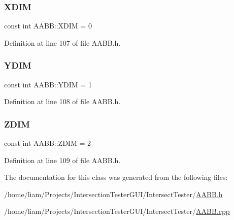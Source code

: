 \subsubsection{\texorpdfstring{X\+D\+IM}{XDIM}}
{\footnotesize\ttfamily const int A\+A\+B\+B\+::\+X\+D\+IM = 0\hspace{0.3cm}{\ttfamily [static]}}



Definition at line 107 of file A\+A\+B\+B.\+h.

\mbox{\label{class_a_a_b_b_a5192e3bdf0789cdc9e5f643b401e5b10}} 
\subsubsection{\texorpdfstring{Y\+D\+IM}{YDIM}}
{\footnotesize\ttfamily const int A\+A\+B\+B\+::\+Y\+D\+IM = 1\hspace{0.3cm}{\ttfamily [static]}}



Definition at line 108 of file A\+A\+B\+B.\+h.

\mbox{\label{class_a_a_b_b_a3e78cd8baa6ab6199afb2cb014e0db62}} 
\subsubsection{\texorpdfstring{Z\+D\+IM}{ZDIM}}
{\footnotesize\ttfamily const int A\+A\+B\+B\+::\+Z\+D\+IM = 2\hspace{0.3cm}{\ttfamily [static]}}



Definition at line 109 of file A\+A\+B\+B.\+h.



The documentation for this class was generated from the following files\+:\begin{DoxyCompactItemize}
\item 
/home/liam/\+Projects/\+Intersection\+Tester\+G\+U\+I/\+Intersect\+Tester/\hyperlink{_a_a_b_b_8h}{A\+A\+B\+B.\+h}\item 
/home/liam/\+Projects/\+Intersection\+Tester\+G\+U\+I/\+Intersect\+Tester/\hyperlink{_a_a_b_b_8cpp}{A\+A\+B\+B.\+cpp}\end{DoxyCompactItemize}
